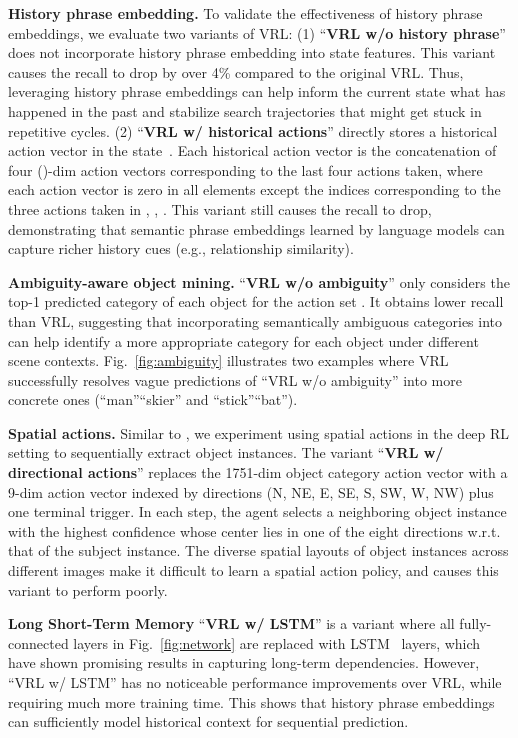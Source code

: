 \documentclass[10pt,twocolumn,letterpaper]{article}
\begin{document}
\textbf{History phrase embedding.}  To validate the effectiveness of history phrase {embeddings}, we evaluate two variants of VRL: (1) ``\textbf{VRL w/o history phrase}'' does not incorporate history phrase embedding into state features. This variant causes the recall to drop by over 4\% compared to the original VRL. Thus, leveraging history phrase embeddings can help inform the current state what has happened in the past and stabilize search trajectories that might get stuck in repetitive cycles. (2) ``\textbf{VRL w/ {historical} actions}'' directly stores a historical action vector in the state~\cite{caicedo2015active}. Each historical action vector is the concatenation of four ()-dim action vectors corresponding to the last four actions taken, where each action vector is zero in all elements except the indices corresponding to the three actions taken in , , . This variant still causes the recall to drop, demonstrating that semantic phrase embeddings learned by language models can capture richer history cues (e.g., relationship similarity).

\textbf{Ambiguity-aware object mining.} ``\textbf{VRL w/o ambiguity}'' only considers the top-1 predicted category of each object for the action set . It obtains lower recall than VRL, suggesting that incorporating {semantically} ambiguous categories into  can help identify a more appropriate category for each object under different scene contexts. Fig.~\ref{fig:ambiguity} illustrates two examples where VRL successfully resolves vague predictions of ``VRL w/o ambiguity'' into more concrete ones (``man''``skier'' and ``stick''``bat'').
 
\textbf{Spatial actions.} Similar to \cite{caicedo2015active}, we experiment using spatial actions in the deep RL setting to sequentially extract object instances.  The variant ``\textbf{VRL w/ directional actions}'' replaces the 1751-dim object category action vector with a 9-dim action vector indexed by directions (N, NE, E, SE, S, SW, W, NW) plus one terminal trigger. In each step, the agent selects a neighboring object instance with the highest confidence whose center lies in one of the eight directions w.r.t. that of the subject instance. The diverse spatial layouts of object instances across different images make it difficult to learn a spatial action policy, and causes this variant to perform poorly.



{\textbf{Long Short-Term Memory} ``\textbf{VRL w/ LSTM}'' is a variant where all fully-connected layers in Fig.~\ref{fig:network} are replaced with LSTM~\cite{hochreiter1997long} layers, which have shown promising results in capturing long-term dependencies.} However, ``VRL w/ LSTM'' has no noticeable performance improvements over VRL, while requiring much more training time. {This shows that history phrase embeddings can sufficiently} model {historical} context for sequential prediction.
\end{document}
